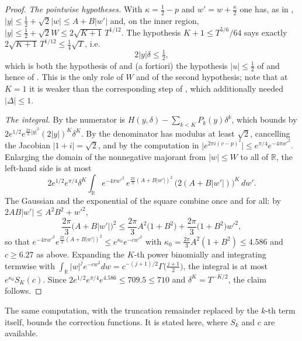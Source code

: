\begin{proof}
\emph{The pointwise hypotheses.}  With $\kappa=\tfrac12-p$ and $w'=w+\tfrac\kappa2$ one has, as
in , $\lvert y\rvert\le\tfrac12+\sqrt2\lvert w\rvert\le A+B\lvert w'\rvert$
and, on the inner region, $\lvert y\rvert\le\tfrac12+\sqrt2W\le2\sqrt{K+1}\,T^{1/12}$.  The
hypothesis $K+1\le T^{5/6}/64$ says exactly $2\sqrt{K+1}\,T^{1/12}\le\tfrac14\sqrt T$, i.e.
\[
  2\lvert y\rvert\delta\le\tfrac12 ,
\]
which is both the hypothesis of  and (a fortiori) the hypothesis
$\lvert u\rvert\le\tfrac12$ of  and hence of
.  This is the only role of $W$ and of the second hypothesis; note that
at $K=1$ it is weaker than the corresponding step of , which additionally
needed $\lvert\Delta\rvert\le1$.

\emph{The integral.}  By  the numerator is
$H(y,\delta)-\sum_{k<K}P_{k}(y)\delta^{k}$, which  bounds by
$2e^{1/2}e^{\frac{2\pi}3\lvert y\rvert^{2}}(2\lvert y\rvert)^{K}\delta^{K}$.  By
 the denominator has modulus at least $\sqrt2$, cancelling the Jacobian
$\lvert1+i\rvert=\sqrt2$, and by the computation in 
$\lvert e^{2\pi i(v-p)^{2}}\rvert\le e^{\pi/4}e^{-4\pi w'^{2}}$.  Enlarging the domain of the
nonnegative majorant from $\lvert w\rvert\le W$ to all of $\mathbb{R}$, the left-hand side is at
most
\[
  2e^{1/2}e^{\pi/4}\delta^{K}\int_{\mathbb{R}}
    e^{-4\pi w'^{2}}\,e^{\frac{2\pi}3(A+B\lvert w'\rvert)^{2}}\,
    \bigl(2(A+B\lvert w'\rvert)\bigr)^{K}\,dw' .
\]
The Gaussian and the exponential of the square combine once and for all: by
$2AB\lvert w'\rvert\le A^{2}B^{2}+w'^{2}$,
\[
  \frac{2\pi}3\bigl(A+B\lvert w'\rvert\bigr)^{2}
  \le\frac{2\pi}3A^{2}\bigl(1+B^{2}\bigr)+\frac{2\pi}3\bigl(1+B^{2}\bigr)w'^{2},
\]
so that $e^{-4\pi w'^{2}}e^{\frac{2\pi}3(A+B\lvert w'\rvert)^{2}}\le e^{\kappa_{0}}e^{-cw'^{2}}$
with $\kappa_{0}=\tfrac{2\pi}3A^{2}(1+B^{2})\le4.586$ and $c\ge6.27$ as above.  Expanding the
$K$-th power binomially and integrating termwise with
$\int_{\mathbb{R}}\lvert w\rvert^{j}e^{-cw^{2}}dw=c^{-(j+1)/2}\Gamma\bigl(\tfrac{j+1}2\bigr)$,
the integral is at most $e^{\kappa_{0}}S_{K}(c)$.  Since
$2e^{1/2}e^{\pi/4}e^{4.586}\le709.5\le710$ and $\delta^{K}=T^{-K/2}$, the claim follows.
\end{proof}

The same computation, with the truncation remainder replaced by the $k$-th term itself, bounds
the correction functions.  It is stated here, where $S_{k}$ and $c$ are available.

